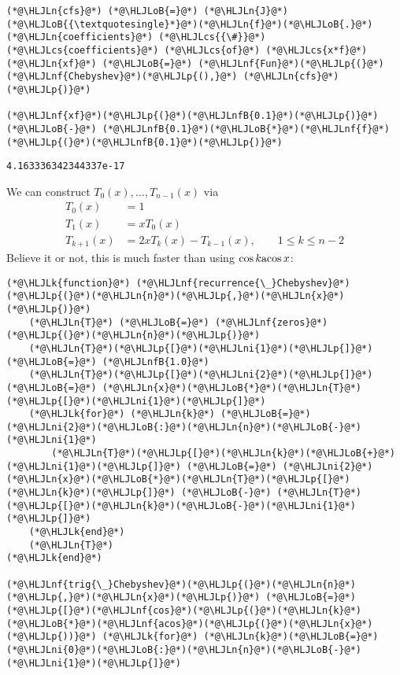 \documentclass[12pt,landscape]{article}
\newcommand{\HLJLk}[1]{\textcolor[RGB]{148,91,176}{\textbf{#1}}}
\newcommand{\HLJLn}[1]{#1}
\newcommand{\HLJLnf}[1]{\textcolor[RGB]{66,102,213}{#1}}
\newcommand{\HLJLnfB}[1]{\textcolor[RGB]{59,151,46}{#1}}
\newcommand{\HLJLni}[1]{\textcolor[RGB]{59,151,46}{#1}}
\newcommand{\HLJLoB}[1]{\textcolor[RGB]{102,102,102}{\textbf{#1}}}
\newcommand{\HLJLp}[1]{#1}
\newcommand{\HLJLcs}[1]{\textcolor[RGB]{153,153,119}{\textit{#1}}}
\def\acos{ {\rm acos}\, }
\begin{document}
{\begin{lstlisting}
(*@\HLJLn{cfs}@*) (*@\HLJLoB{=}@*) (*@\HLJLn{J}@*)(*@\HLJLoB{{\textquotesingle}*}@*)(*@\HLJLn{f}@*)(*@\HLJLoB{.}@*)(*@\HLJLn{coefficients}@*) (*@\HLJLcs{{\#}}@*) (*@\HLJLcs{coefficients}@*) (*@\HLJLcs{of}@*) (*@\HLJLcs{x*f}@*)
(*@\HLJLn{xf}@*) (*@\HLJLoB{=}@*) (*@\HLJLnf{Fun}@*)(*@\HLJLp{(}@*)(*@\HLJLnf{Chebyshev}@*)(*@\HLJLp{(),}@*) (*@\HLJLn{cfs}@*)(*@\HLJLp{)}@*)

(*@\HLJLnf{xf}@*)(*@\HLJLp{(}@*)(*@\HLJLnfB{0.1}@*)(*@\HLJLp{)}@*) (*@\HLJLoB{-}@*) (*@\HLJLnfB{0.1}@*)(*@\HLJLoB{*}@*)(*@\HLJLnf{f}@*)(*@\HLJLp{(}@*)(*@\HLJLnfB{0.1}@*)(*@\HLJLp{)}@*)
\end{lstlisting}

\begin{lstlisting}
4.163336342344337e-17
\end{lstlisting}


We can construct $T_0(x),\ldots,T_{n-1}(x)$ via
\begin{align*}
    T_0(x) &= 1\\
    T_1(x) &= x T_0(x) \\
    T_{k+1}(x) &= 2x  T_k(x) -  T_{k-1}(x), \qquad 1 \leq k \leq n-2
\end{align*}
Believe it or not, this is much faster than using $\cos k \acos x$:


\begin{lstlisting}
(*@\HLJLk{function}@*) (*@\HLJLnf{recurrence{\_}Chebyshev}@*)(*@\HLJLp{(}@*)(*@\HLJLn{n}@*)(*@\HLJLp{,}@*)(*@\HLJLn{x}@*)(*@\HLJLp{)}@*)
    (*@\HLJLn{T}@*) (*@\HLJLoB{=}@*) (*@\HLJLnf{zeros}@*)(*@\HLJLp{(}@*)(*@\HLJLn{n}@*)(*@\HLJLp{)}@*)
    (*@\HLJLn{T}@*)(*@\HLJLp{[}@*)(*@\HLJLni{1}@*)(*@\HLJLp{]}@*) (*@\HLJLoB{=}@*) (*@\HLJLnfB{1.0}@*)
    (*@\HLJLn{T}@*)(*@\HLJLp{[}@*)(*@\HLJLni{2}@*)(*@\HLJLp{]}@*) (*@\HLJLoB{=}@*) (*@\HLJLn{x}@*)(*@\HLJLoB{*}@*)(*@\HLJLn{T}@*)(*@\HLJLp{[}@*)(*@\HLJLni{1}@*)(*@\HLJLp{]}@*)
    (*@\HLJLk{for}@*) (*@\HLJLn{k}@*) (*@\HLJLoB{=}@*) (*@\HLJLni{2}@*)(*@\HLJLoB{:}@*)(*@\HLJLn{n}@*)(*@\HLJLoB{-}@*)(*@\HLJLni{1}@*)
        (*@\HLJLn{T}@*)(*@\HLJLp{[}@*)(*@\HLJLn{k}@*)(*@\HLJLoB{+}@*)(*@\HLJLni{1}@*)(*@\HLJLp{]}@*) (*@\HLJLoB{=}@*) (*@\HLJLni{2}@*)(*@\HLJLn{x}@*)(*@\HLJLoB{*}@*)(*@\HLJLn{T}@*)(*@\HLJLp{[}@*)(*@\HLJLn{k}@*)(*@\HLJLp{]}@*) (*@\HLJLoB{-}@*) (*@\HLJLn{T}@*)(*@\HLJLp{[}@*)(*@\HLJLn{k}@*)(*@\HLJLoB{-}@*)(*@\HLJLni{1}@*)(*@\HLJLp{]}@*)
    (*@\HLJLk{end}@*)
    (*@\HLJLn{T}@*)
(*@\HLJLk{end}@*)

(*@\HLJLnf{trig{\_}Chebyshev}@*)(*@\HLJLp{(}@*)(*@\HLJLn{n}@*)(*@\HLJLp{,}@*)(*@\HLJLn{x}@*)(*@\HLJLp{)}@*) (*@\HLJLoB{=}@*) (*@\HLJLp{[}@*)(*@\HLJLnf{cos}@*)(*@\HLJLp{(}@*)(*@\HLJLn{k}@*)(*@\HLJLoB{*}@*)(*@\HLJLnf{acos}@*)(*@\HLJLp{(}@*)(*@\HLJLn{x}@*)(*@\HLJLp{))}@*) (*@\HLJLk{for}@*) (*@\HLJLn{k}@*)(*@\HLJLoB{=}@*)(*@\HLJLni{0}@*)(*@\HLJLoB{:}@*)(*@\HLJLn{n}@*)(*@\HLJLoB{-}@*)(*@\HLJLni{1}@*)(*@\HLJLp{]}@*)


\end{lstlisting}}
\end{document}
